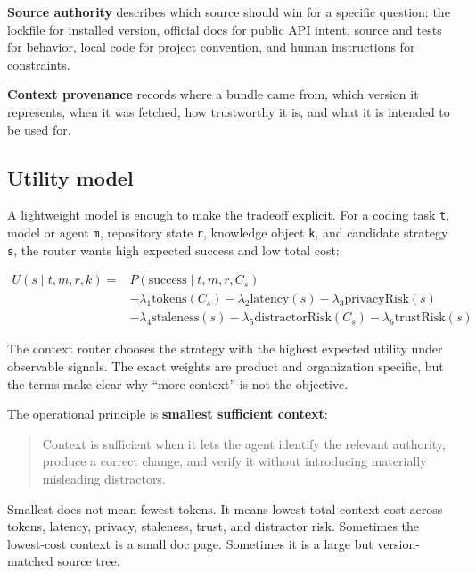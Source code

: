 \documentclass[
  11pt,
  letterpaper,
  numbers=noendperiod,
  parskip=half]{scrartcl}
\begin{document}
\textbf{Source authority} describes which source should win for a
specific question: the lockfile for installed version, official docs for
public API intent, source and tests for behavior, local code for project
convention, and human instructions for constraints.

\textbf{Context provenance} records where a bundle came from, which
version it represents, when it was fetched, how trustworthy it is, and
what it is intended to be used for.

\subsection{Utility model}\label{sec-utility}

A lightweight model is enough to make the tradeoff explicit. For a
coding task \texttt{t}, model or agent \texttt{m}, repository state
\texttt{r}, knowledge object \texttt{k}, and candidate strategy
\texttt{s}, the router wants high expected success and low total cost:

\begin{align*}
U(s \mid t,m,r,k) ={}&
P(\mathrm{success} \mid t,m,r,C_s) \\
&- \lambda_1\mathrm{tokens}(C_s)
- \lambda_2\mathrm{latency}(s)
- \lambda_3\mathrm{privacyRisk}(s) \\
&- \lambda_4\mathrm{staleness}(s)
- \lambda_5\mathrm{distractorRisk}(C_s)
- \lambda_6\mathrm{trustRisk}(s)
\end{align*}

The context router chooses the strategy with the highest expected
utility under observable signals. The exact weights are product and
organization specific, but the terms make clear why ``more context'' is
not the objective.

\figureUtilityTradeoff

The operational principle is \textbf{smallest sufficient context}:

\begin{quote}
Context is sufficient when it lets the agent identify the relevant
authority, produce a correct change, and verify it without introducing
materially misleading distractors.
\end{quote}

Smallest does not mean fewest tokens. It means lowest total context cost
across tokens, latency, privacy, staleness, trust, and distractor risk.
Sometimes the lowest-cost context is a small doc page. Sometimes it is a
large but version-matched source tree.
\end{document}
